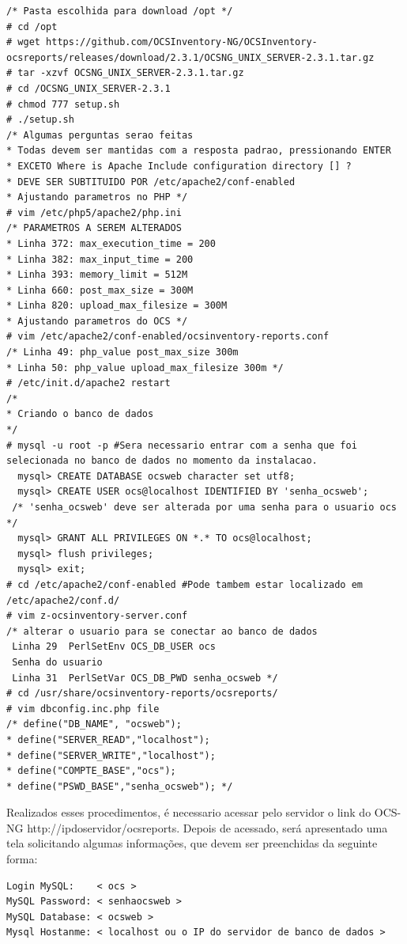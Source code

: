 \documentclass[
               12pt,             %
               a4paper,          %
               chapter=TITLE,    %
               section=TITLE,    %
               english,
               brazil            
]{article}
\begin{document}
\begin{lstlisting}
/* Pasta escolhida para download /opt */
# cd /opt
# wget https://github.com/OCSInventory-NG/OCSInventory-ocsreports/releases/download/2.3.1/OCSNG_UNIX_SERVER-2.3.1.tar.gz
# tar -xzvf OCSNG_UNIX_SERVER-2.3.1.tar.gz
# cd /OCSNG_UNIX_SERVER-2.3.1
# chmod 777 setup.sh
# ./setup.sh
/* Algumas perguntas serao feitas 
* Todas devem ser mantidas com a resposta padrao, pressionando ENTER
* EXCETO Where is Apache Include configuration directory [] ?
* DEVE SER SUBTITUIDO POR /etc/apache2/conf-enabled
* Ajustando parametros no PHP */
# vim /etc/php5/apache2/php.ini
/* PARAMETROS A SEREM ALTERADOS
* Linha 372: max_execution_time = 200
* Linha 382: max_input_time = 200
* Linha 393: memory_limit = 512M
* Linha 660: post_max_size = 300M
* Linha 820: upload_max_filesize = 300M
* Ajustando parametros do OCS */
# vim /etc/apache2/conf-enabled/ocsinventory-reports.conf
/* Linha 49: php_value post_max_size 300m
* Linha 50: php_value upload_max_filesize 300m */
# /etc/init.d/apache2 restart
/*
* Criando o banco de dados
*/
# mysql -u root -p #Sera necessario entrar com a senha que foi selecionada no banco de dados no momento da instalacao.
  mysql> CREATE DATABASE ocsweb character set utf8;
  mysql> CREATE USER ocs@localhost IDENTIFIED BY 'senha_ocsweb'; 
 /* 'senha_ocsweb' deve ser alterada por uma senha para o usuario ocs */
  mysql> GRANT ALL PRIVILEGES ON *.* TO ocs@localhost;
  mysql> flush privileges;
  mysql> exit;
# cd /etc/apache2/conf-enabled #Pode tambem estar localizado em /etc/apache2/conf.d/
# vim z-ocsinventory-server.conf
/* alterar o usuario para se conectar ao banco de dados
 Linha 29  PerlSetEnv OCS_DB_USER ocs
 Senha do usuario
 Linha 31  PerlSetVar OCS_DB_PWD senha_ocsweb */
# cd /usr/share/ocsinventory-reports/ocsreports/
# vim dbconfig.inc.php file
/* define("DB_NAME", "ocsweb");
* define("SERVER_READ","localhost");
* define("SERVER_WRITE","localhost");
* define("COMPTE_BASE","ocs");
* define("PSWD_BASE","senha_ocsweb"); */
\end{lstlisting}

Realizados esses procedimentos, é necessario acessar pelo servidor o link do OCS-NG http://ipdoservidor/ocsreports. Depois de acessado, será apresentado uma tela solicitando algumas informações, que devem ser preenchidas da seguinte forma:\\

\begin{verbatim}
Login MySQL:    < ocs >
MySQL Password: < senhaocsweb >
MySQL Database: < ocsweb >
Mysql Hostanme: < localhost ou o IP do servidor de banco de dados >
\end{verbatim}
\end{document}
